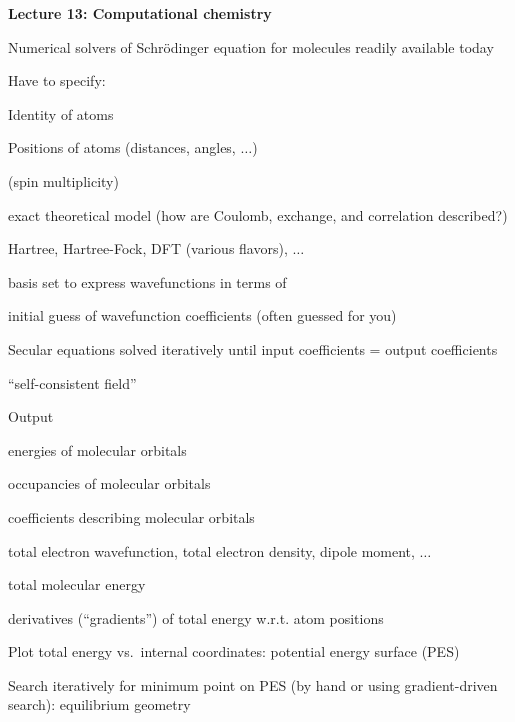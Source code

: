 \documentclass[11pt]{article}
\begin{document}
\begin{outline}
\item {\bf Lecture 13: Computational chemistry}
  \begin{outline}
  \item Numerical solvers of Schr\"odinger equation for molecules readily
    available today
  \item Have to specify:
    \begin{outline}
    \item Identity of atoms
    \item Positions of atoms (distances, angles, $\ldots$)
    \item (spin multiplicity)
    \item exact theoretical model (how are Coulomb, exchange, and correlation described?)
      \begin{outline}
      \item Hartree, Hartree-Fock, DFT (various flavors), $\ldots$
      \end{outline}
    \item basis set to express wavefunctions in terms of
    \item initial guess of wavefunction coefficients (often guessed for you)
    \end{outline}
  \item Secular equations solved iteratively until input coefficients = output coefficients
    \begin{outline}
      \item ``self-consistent field''
    \end{outline}
  \item Output
    \begin{outline}
      \item energies of molecular orbitals
      \item occupancies of molecular orbitals
      \item coefficients describing molecular orbitals
      \item total electron wavefunction, total electron density, dipole moment, $\ldots$
      \item total molecular energy
      \item derivatives (``gradients'') of total energy w.r.t. atom positions
    \end{outline}
  \item Plot total energy vs.\ internal coordinates: potential energy surface (PES)
  \item Search iteratively for minimum point on PES (by hand or using
    gradient-driven search): equilibrium geometry

\end{outline}
\end{outline}
\end{document}
